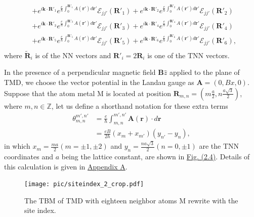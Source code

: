 \documentclass{report}
\begin{document}
\begin{equation}
\begin{aligned}
		 & + e^{i\mathbf{k\cdot}\mathbf{R}'_{1} }e^{\frac{e}{\hbar}\int_{0}^{\mathbf{R}'_{1}}A(\mathbf{r'})d\mathbf{r'}} \mathcal{E}_{jj'}(\mathbf{R}'_{1})+ e^{i\mathbf{k\cdot}\mathbf{R}'_{2} }e^{\frac{e}{\hbar}\int_{0}^{\mathbf{R}'_{2}}A(\mathbf{r'})d\mathbf{r'}} \mathcal{E}_{jj'}(\mathbf{R}'_{2})                                                 \\
		 & + e^{i\mathbf{k\cdot}\mathbf{R}'_{3} }e^{\frac{e}{\hbar}\int_{0}^{\mathbf{R}'_{3}}A(\mathbf{r'})d\mathbf{r'}} \mathcal{E}_{jj'}(\mathbf{R}'_{3})+ e^{i\mathbf{k\cdot}\mathbf{R}'_{4} }e^{\frac{e}{\hbar}\int_{0}^{\mathbf{R}'_{4}}A(\mathbf{r'})d\mathbf{r'}} \mathcal{E}_{jj'}(\mathbf{R}'_{4})                                                 \\
		 & + e^{i\mathbf{k\cdot}\mathbf{R}'_{5} }e^{\frac{e}{\hbar}\int_{0}^{\mathbf{R}'_{5}}A(\mathbf{r'})d\mathbf{r'}} \mathcal{E}_{jj'}(\mathbf{R}'_{5})+ e^{i\mathbf{k\cdot}\mathbf{R}'_{6} }e^{\frac{e}{\hbar}\int_{0}^{\mathbf{R}'_{6}}A(\mathbf{r'})d\mathbf{r'}} \mathcal{E}_{jj'}(\mathbf{R}'_{6})     ,                                            \\
	\end{aligned}
\end{equation}
where $\tilde{\mathbf{R}}_{i}$ is of the \ac{NN} vectors and $\mathbf{R}'_{i} = 2 \mathbf{R}_{i}$ is one of the \ac{TNN} vectors.

In the presence of a perpendicular magnetic field $\mathbf{B} \hat{z}$ applied to the plane of \ac{TMD}, we choose the vector potential in the Landau gauge as $\mathbf{A} = (0, Bx, 0)$. Suppose that the atom metal M is located at position $\mathbf{R}_{m,n} = \left(m \frac{a}{2}, n \frac{a\sqrt{3}}{2}\right)$, where $m,n \in \mathbb{Z}$, let us define a shorthand notation for these extra terms
\begin{equation}
	\begin{aligned}
		\theta_{m,n}^{m',n'}
		 & = \frac{e}{\hbar} \int_{m,n}^{m',n'} \mathbf{A}(\mathbf{r}) \cdot d\mathbf{r} \\
		 & = \frac{eB}{2\hbar}(x_{m} + x_{m'})(y_{n'} - y_{n}),
	\end{aligned}
\end{equation}
in which $x_{m} = \frac{ma}{2}(m = \pm 1, \pm 2)$ and $y_{n} = \frac{na\sqrt{3}}{2}(n = 0,\pm 1)$ are the \ac{TNN} coordinates and $a$ being the lattice constant, are shown in \hyperref[fig:site index]{Fig. (2.4)}. Details of this calculation is given in \hyperref[appendix A]{Appendix A}.
\begin{figure}[H]
	\centering
	\texttt{[image: pic/siteindex\_2\_crop.pdf]}
	\caption[TMD with six neighbors atom M rewrite with the site index.]{\label{fig:site index} The \ac{TBM} of \ac{TMD} with eighteen neighbor atoms M rewrite with the site index.}
\end{figure}
\end{document}
